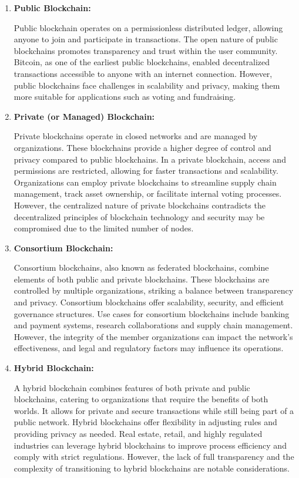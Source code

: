 \begin{enumerate}
    \item \textbf{Public Blockchain:}

    Public blockchain operates on a permissionless distributed ledger, allowing anyone to join and participate in transactions. The open nature of public blockchains promotes transparency and trust within the user community. Bitcoin, as one of the earliest public blockchains, enabled decentralized transactions accessible to anyone with an internet connection. However, public blockchains face challenges in scalability and privacy, making them more suitable for applications such as voting and fundraising.
    
    \item \textbf{Private (or Managed) Blockchain:}

    Private blockchains operate in closed networks and are managed by organizations. These blockchains provide a higher degree of control and privacy compared to public blockchains. In a private blockchain, access and permissions are restricted, allowing for faster transactions and scalability. Organizations can employ private blockchains to streamline supply chain management, track asset ownership, or facilitate internal voting processes. However, the centralized nature of private blockchains contradicts the decentralized principles of blockchain technology and security may be compromised due to the limited number of nodes.
    
    \item \textbf{Consortium Blockchain:}

    Consortium blockchains, also known as federated blockchains, combine elements of both public and private blockchains. These blockchains are controlled by multiple organizations, striking a balance between transparency and privacy. Consortium blockchains offer scalability, security, and efficient governance structures. Use cases for consortium blockchains include banking and payment systems, research collaborations and supply chain management. However, the integrity of the member organizations can impact the network's effectiveness, and legal and regulatory factors may influence its operations.
    
    \item \textbf{Hybrid Blockchain:}

    A hybrid blockchain combines features of both private and public blockchains, catering to organizations that require the benefits of both worlds. It allows for private and secure transactions while still being part of a public network. Hybrid blockchains offer flexibility in adjusting rules and providing privacy as needed. Real estate, retail, and highly regulated industries can leverage hybrid blockchains to improve process efficiency and comply with strict regulations. However, the lack of full transparency and the complexity of transitioning to hybrid blockchains are notable considerations.
\end{enumerate}

